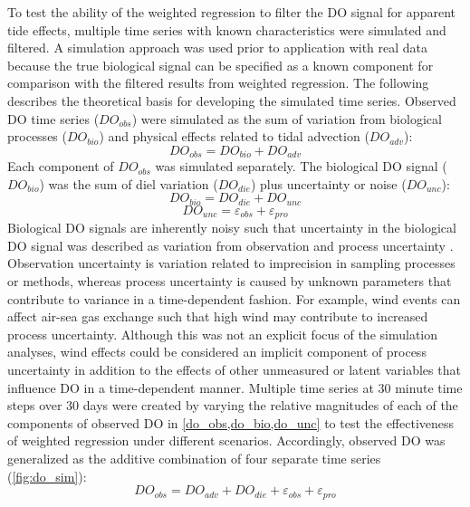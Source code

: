 \documentclass[letterpaper,12pt,oneside]{article}\usepackage[]{graphicx}\usepackage[]{color}
\begin{document}
To test the ability of the weighted regression to filter the \ac{DO} signal for apparent tide effects, multiple time series with known characteristics were simulated and filtered.  A simulation approach was used prior to application with real data because the true biological signal can be specified as a known component for comparison with the filtered results from weighted regression. The following describes the theoretical basis for developing the simulated time series.  Observed \ac{DO} time series ($DO_{obs}$) were simulated as the sum of variation from biological processes ($DO_{bio}$) and physical effects related to tidal advection ($DO_{adv}$):  
\begin{equation} \label{do_obs}
DO_{obs} = DO_{bio} + DO_{adv}
\end{equation}
Each component of $DO_{obs}$ was simulated separately.  The biological \ac{DO} signal ($DO_{bio}$) was the sum of diel variation ($DO_{die}$) plus uncertainty or noise ($DO_{unc}$):
\begin{equation} \label{do_bio} 
DO_{bio} = DO_{die} + DO_{unc}
\end{equation} 
\begin{equation} \label{do_unc}
DO_{unc} = \varepsilon_{obs} + \varepsilon_{pro}
\end{equation}
Biological \ac{DO} signals are inherently noisy \citep{Batt12} such that uncertainty in the biological \ac{DO} signal was described as variation from observation and process uncertainty \citep[$\varepsilon_{obs}$ and $\varepsilon_{pro}$,][]{Hilborn97}. Observation uncertainty is variation related to imprecision in sampling processes or methods, whereas process uncertainty is caused by unknown parameters that contribute to variance in a time-dependent fashion.  For example, wind events can affect air-sea gas exchange \citep{Ziegler98,Caffrey14} such that high wind may contribute to increased process uncertainty.  Although this was not an explicit focus of the simulation analyses, wind effects could be considered an implicit component of process uncertainty in addition to the effects of other unmeasured or latent variables that influence \ac{DO} in a time-dependent manner.  Multiple time series at 30 minute time steps over 30 days were created by varying the relative magnitudes of each of the components of observed \ac{DO} in \cref{do_obs,do_bio,do_unc} to test the effectiveness of weighted regression under different scenarios.  Accordingly, observed \ac{DO} was generalized as the additive combination of four separate time series (\cref{fig:do_sim}):
\begin{equation} \label{do_obs_all}
DO_{obs} = DO_{adv} + DO_{die} + \varepsilon_{obs} + \varepsilon_{pro}
\end{equation} 
\end{document}
